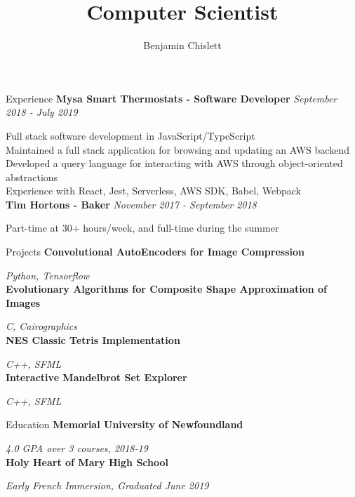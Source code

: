 \documentclass[11pt, letterpaper]{article}
\title{Computer Scientist}
\author{Benjamin Chislett}
\date{}
\begin{document}
\begin{center}
  \Huge\theauthor
  \par
  \huge\thetitle
  \par
\end{center}

\begin{section}{Experience}
\textbf{Mysa Smart Thermostats - Software Developer}
\hfill
\textit{September 2018 - July 2019}

Full stack software development in JavaScript/TypeScript\\
Maintained a full stack application for browsing and updating an AWS backend\\
Developed a query language for interacting with AWS through object-oriented abstractions\\
Experience with React, Jest, Serverless, AWS SDK, Babel, Webpack\\

\textbf{Tim Hortons - Baker}
\textit{November 2017 - September 2018}

Part-time at 30+ hours/week, and full-time during the summer
\end{section}

\begin{section}{Projects}
\textbf{Convolutional AutoEncoders for Image Compression}

\textit{Python, Tensorflow}\\

\textbf{Evolutionary Algorithms for Composite Shape Approximation of Images}

\textit{C, Cairographics}\\

\textbf{NES Classic Tetris Implementation}

\textit{C++, SFML}\\

\textbf{Interactive Mandelbrot Set Explorer}

\textit{C++, SFML}
\end{section}

\begin{section}{Education}
\textbf{Memorial University of Newfoundland}

\textit{4.0 GPA over 3 courses, 2018-19}\\

\textbf{Holy Heart of Mary High School}

\textit{Early French Immersion, Graduated June 2019}
\end{section}
\end{document}
